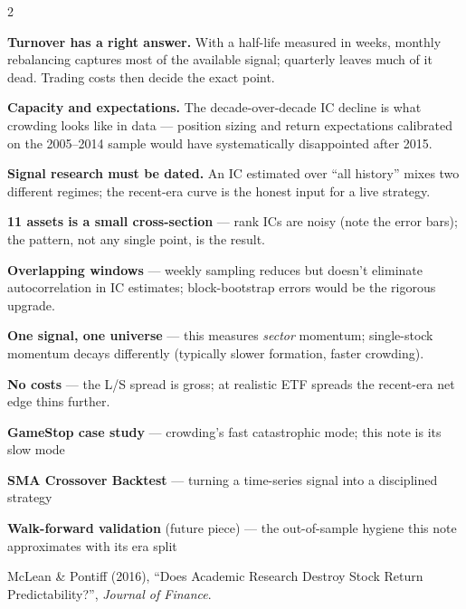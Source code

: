\documentclass{pyportfolios-note}
\begin{document}
\begin{multicols}{2}
\begin{notebullets}
\item \textbf{Turnover has a right answer.} With a half-life measured in weeks,
      monthly rebalancing captures most of the available signal; quarterly
      leaves much of it dead. Trading costs then decide the exact point.
\item \textbf{Capacity and expectations.} The decade-over-decade IC decline is
      what crowding looks like in data — position sizing and return
      expectations calibrated on the 2005–2014 sample would have systematically
      disappointed after 2015.
\item \textbf{Signal research must be dated.} An IC estimated over ``all
      history'' mixes two different regimes; the recent-era curve is the honest
      input for a live strategy.
\end{notebullets}

\begin{notebullets}
\item \textbf{11 assets is a small cross-section} — rank ICs are noisy (note
      the error bars); the pattern, not any single point, is the result.
\item \textbf{Overlapping windows} — weekly sampling reduces but doesn't
      eliminate autocorrelation in IC estimates; block-bootstrap errors would
      be the rigorous upgrade.
\item \textbf{One signal, one universe} — this measures \textit{sector}
      momentum; single-stock momentum decays differently (typically slower
      formation, faster crowding).
\item \textbf{No costs} — the L/S spread is gross; at realistic ETF spreads the
      recent-era net edge thins further.
\end{notebullets}

\begin{notebullets}
\item \textbf{GameStop case study} — crowding's fast catastrophic mode; this
      note is its slow mode
\item \textbf{SMA Crossover Backtest} — turning a time-series signal into a
      disciplined strategy
\item \textbf{Walk-forward validation} (future piece) — the out-of-sample
      hygiene this note approximates with its era split
\end{notebullets}
\end{multicols}

\begin{notereferences}
\item McLean \& Pontiff (2016), ``Does Academic Research Destroy Stock Return
      Predictability?'', \textit{Journal of Finance}.
\end{notereferences}
\end{document}
